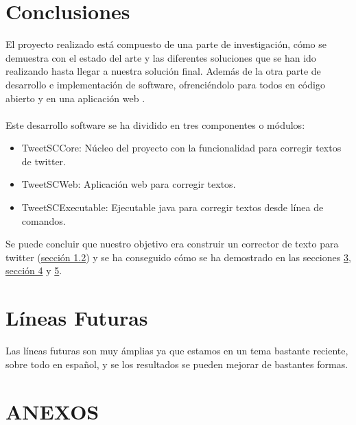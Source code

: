 \documentclass[spanish,12pt, a4paper,twoside]{paper}
\let\oldsection\section
\def\section{\cleardoublepage\oldsection}
\begin{document}
\section{Conclusiones}\label{conclusiones}
El proyecto realizado está compuesto de una parte de investigación, cómo se demuestra con el estado del arte y las diferentes soluciones que se han ido realizando hasta llegar a nuestra solución final. Además de la otra parte de desarrollo e implementación de software, ofrenciéndolo para todos en código abierto y en una aplicación web \cite{tweetscweb}.\\\\
Este desarrollo software se ha dividido en tres componentes o módulos:
\begin{itemize}
	\item TweetSCCore: Núcleo del proyecto con la funcionalidad para corregir textos de twitter.
	\item TweetSCWeb: Aplicación web para corregir textos.
	\item TweetSCExecutable: Ejecutable java para corregir textos desde línea de comandos.
\end{itemize}
Se puede concluir que nuestro objetivo era construir un corrector de texto para twitter (\hyperref[sec:objetivos]{sección 1.2}) y se ha conseguido cómo se ha demostrado en las secciones \hyperref[sec:solucionpropuesta]{3}, \hyperref[sec:implementacion]{sección 4} y \hyperref[sec:implementacion]{5}.

\section{Líneas Futuras}\label{lineasfuturas}
Las líneas futuras son muy ámplias ya que estamos en un tema bastante reciente, sobre todo en español, y se los resultados se pueden mejorar de bastantes formas.

\section*{ANEXOS}
\end{document}
